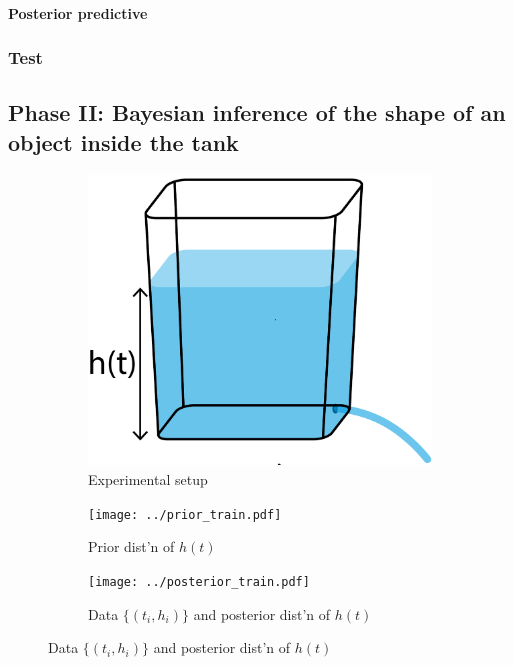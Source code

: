 \documentclass[openacc]{rsproca_new}%
\begin{document}
\paragraph{Posterior predictive}

\subsubsection{Test}

\subsection{Phase II: Bayesian inference of the shape of an object inside the tank}



\begin{figure}[h!]
    \centering
        \begin{subfigure}[b]{0.3\textwidth}
    	\includegraphics[width=\textwidth]{../tank_geometry/naked_tank.pdf}
	\caption{Experimental setup} \label{fig:naked_tank}
    \end{subfigure}
    
     \begin{subfigure}[b]{0.49\textwidth}
    	\texttt{[image: ../prior\_train.pdf]}
	\caption{Prior dist'n of $h(t)$} \label{fig:prior_train}
    \end{subfigure}
     \begin{subfigure}[b]{0.49\textwidth}
    	\texttt{[image: ../posterior\_train.pdf]}
	\caption{Data $\{(t_i, h_i)\}$ and posterior dist'n of $h(t)$} \label{fig:posterior_train}
    \end{subfigure}
    

\end{figure}
\end{document}
